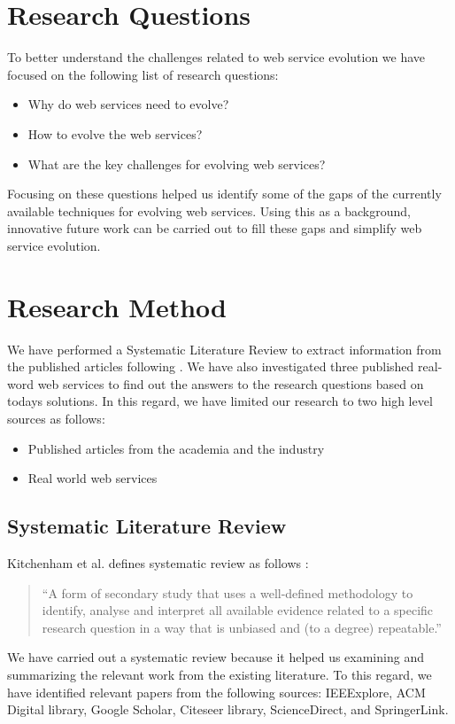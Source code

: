 \documentclass[runningheads,a4paper]{llncs}
\begin{document}

\section{Research Questions} %
\label{sec:research_questions}
To better understand the challenges related to web service evolution we have focused on the following list of research questions:

\begin{itemize}
  \item Why do web services need to evolve?
  \item How to evolve the web services?
  \item What are the key challenges for evolving web services?
\end{itemize}

Focusing on these questions helped us identify some of the gaps of the currently available techniques for evolving web services. Using this as a background, innovative future work can be carried out to fill these gaps and simplify web service evolution.

\section{Research Method} %
\label{sec:research_method}

We have performed a Systematic Literature Review to extract information from the published articles following \cite{kitchenham2007guidelines}. We have also investigated three published real-word web services to find out the answers to the research questions based on todays solutions.
In this regard, we have limited our research to two high level sources as follows:

\begin{itemize}
  \item Published articles from the academia and the industry
  \item Real world web services
\end{itemize}

\subsection{Systematic Literature Review} %
\label{sub:systematic_literature_review}
Kitchenham et al. defines systematic review as follows \cite{kitchenham2007guidelines}:

\begin{quote}
``A form of secondary study that uses a well-defined methodology to identify, analyse and interpret all available evidence related to a specific research question in a way that is unbiased and (to a degree) repeatable.''
\end{quote}
We have carried out a systematic review because it helped us examining and summarizing the relevant work from the existing literature. To this regard, we have identified relevant papers from the following sources: IEEExplore, ACM Digital library, Google Scholar, Citeseer library, ScienceDirect, and SpringerLink.
\end{document}
